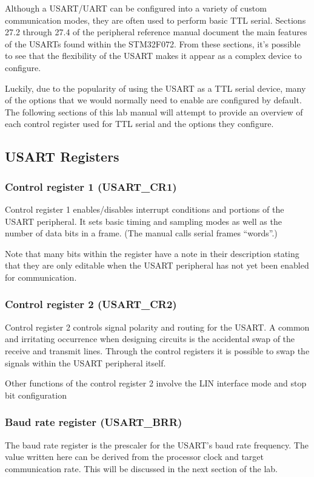 \documentclass[11pt,fleqn]{book} %
\begin{document}
Although a USART/UART can be configured into a variety of custom communication modes, they are often used to perform basic TTL serial. Sections 27.2 through 27.4 of the peripheral reference manual document the main features of the USARTs found within the STM32F072. From these sections, it's possible to see that the flexibility of the USART makes it appear as a complex device to configure. 

Luckily, due to the popularity of using the USART as a TTL serial device, many of the options that we would normally need to enable are configured by default. The following sections of this lab manual will attempt to provide an overview of each control register used for TTL serial and the options they configure. 

\subsection{USART Registers}	

\subsubsection{Control register 1 (USART\_CR1)}
Control register 1 enables/disables interrupt conditions and portions of the USART peripheral. It sets basic timing and sampling modes as well as the number of data bits in a frame. (The manual calls serial frames ``words''.) 

Note that many bits within the register have a note in their description stating that they are only editable when the USART peripheral has not yet been enabled for communication. 

\subsubsection{Control register 2 (USART\_CR2)}
Control register 2 controls signal polarity and routing for the USART. A common and irritating occurrence when designing circuits is the accidental swap of the receive and transmit lines. Through the control registers it is possible to swap the signals within the USART peripheral itself. 

Other functions of the control register 2 involve the LIN interface mode and stop bit configuration 

\subsubsection{Baud rate register (USART\_BRR)}
The baud rate register is the prescaler for the USART's baud rate frequency. The value written here can be derived from the processor clock and target communication rate. This will be discussed in the next section of the lab.
\end{document}
